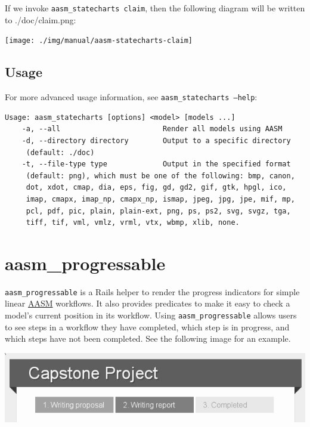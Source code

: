 \documentclass[document.tex]{subfiles}
\begin{document}
\pagebreak

If we invoke {\tt aasm\_statecharts claim}, then the following diagram will be written to ./doc/claim.png:

\vspace{5mm}

\begin{center}
 \texttt{[image: ./img/manual/aasm-statecharts-claim]}
\end{center}


\subsection{Usage}

For more advanced usage information, see {\tt aasm\_statecharts --help}:

\begin{verbatim}Usage: aasm_statecharts [options] <model> [models ...]
    -a, --all                        Render all models using AASM
    -d, --directory directory        Output to a specific directory
     (default: ./doc)
    -t, --file-type type             Output in the specified format
     (default: png), which must be one of the following: bmp, canon,
     dot, xdot, cmap, dia, eps, fig, gd, gd2, gif, gtk, hpgl, ico,
     imap, cmapx, imap_np, cmapx_np, ismap, jpeg, jpg, jpe, mif, mp,
     pcl, pdf, pic, plain, plain-ext, png, ps, ps2, svg, svgz, tga,
     tiff, tif, vml, vmlz, vrml, vtx, wbmp, xlib, none.
\end{verbatim}



\section{aasm\_progressable}
\label {sec:aasm-progressable-manual}

{\tt aasm\_progressable} is a Rails helper to render the progress indicators for simple linear \href{https://github.com/aasm/aasm}{AASM} workflows. It also provides predicates to make it easy to check a model's current position in its workflow. Using {\tt aasm\_progressable} allows users to see steps in a workflow they have completed, which step is in progress, and which steps have not been completed. See the following image for an example.

\vspace{5mm}

\begin{center}
 \includegraphics[width=6.0in]{./img/manual/aasm-progressable-example}
\end{center}
\end{document}
